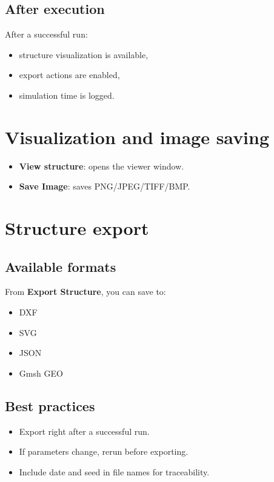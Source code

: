 \documentclass[11pt,a4paper]{article}
\begin{document}
\subsection{After execution}
After a successful run:
\begin{itemize}[leftmargin=1.5em]
  \item structure visualization is available,
  \item export actions are enabled,
  \item simulation time is logged.
\end{itemize}

\section{Visualization and image saving}
\begin{itemize}[leftmargin=1.5em]
  \item \textbf{View structure}: opens the viewer window.
  \item \textbf{Save Image}: saves PNG/JPEG/TIFF/BMP.
\end{itemize}

\section{Structure export}
\subsection{Available formats}
From \textbf{Export Structure}, you can save to:
\begin{itemize}[leftmargin=1.5em]
  \item DXF
  \item SVG
  \item JSON
  \item Gmsh GEO
\end{itemize}

\subsection{Best practices}
\begin{itemize}[leftmargin=1.5em]
  \item Export right after a successful run.
  \item If parameters change, rerun before exporting.
  \item Include date and seed in file names for traceability.
\end{itemize}
\end{document}
